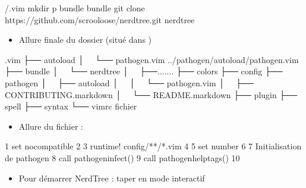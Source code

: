 \documentclass[letterpaper,10pt,french]{sphinxmanual}
\begin{document}
%
\begin{sphinxVerbatim}[commandchars=\\\{\}]
\PYGZdl{}  \PYGZti{}/.vim
\PYGZdl{} mkdir \PYGZhy{}p bundle
\PYGZdl{}  bundle
\PYGZdl{} git clone https://github.com/scrooloose/nerdtree.git nerdtree
\end{sphinxVerbatim}
\begin{itemize}
\item {} 
Allure finale du dossier  (situé dans \sphinxcode{\sphinxupquote{\textasciitilde{}/}})

\end{itemize}

%
\begin{sphinxVerbatim}[commandchars=\\\{\}]
.vim
├── autoload
│   └── pathogen.vim \PYGZhy{}\PYGZgt{} ../pathogen/autoload/pathogen.vim
├── bundle
│   └── nerdtree
│       ├──.......
├── colors
├── config
├── pathogen
│   ├── autoload
│   │   └── pathogen.vim
│   ├── CONTRIBUTING.markdown
│   └── README.markdown
├── plugin
├── spell
├── syntax
└── vimrc fichier
\end{sphinxVerbatim}
\begin{itemize}
\item {} 
Allure du fichier  :

\end{itemize}

%
\begin{sphinxVerbatim}[commandchars=\\\{\}]
1 set nocompatible
2
3 runtime! config/**/*.vim
4
5 set number
6
7 \PYGZdq{} Initialisation de pathogen
8 call pathogen\PYGZsh{}infect()
9 call pathogen\PYGZsh{}helptags()
10
\end{sphinxVerbatim}
\begin{itemize}
\item {} 
Pour démarrer NerdTree : taper  en mode interactif

\end{itemize}
\end{document}
